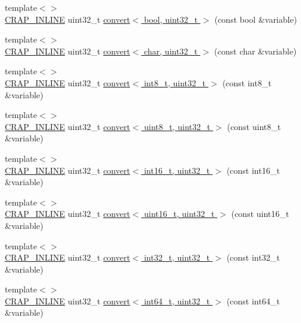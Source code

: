 \begin{DoxyCompactItemize}
\item 
{\footnotesize template$<$$>$ }\\\hyperlink{config__x86_8h_a5a40526b8d842e7ff731509998bb0f1c}{C\+R\+A\+P\+\_\+\+I\+N\+L\+I\+N\+E} uint32\+\_\+t \hyperlink{namespacecrap_aece15dfafe39298514a2b4d2c488994b}{convert$<$ bool, uint32\+\_\+t $>$} (const bool \&variable)
\item 
{\footnotesize template$<$$>$ }\\\hyperlink{config__x86_8h_a5a40526b8d842e7ff731509998bb0f1c}{C\+R\+A\+P\+\_\+\+I\+N\+L\+I\+N\+E} uint32\+\_\+t \hyperlink{namespacecrap_a2374171de1b2f137cbf0b27d0af1c397}{convert$<$ char, uint32\+\_\+t $>$} (const char \&variable)
\item 
{\footnotesize template$<$$>$ }\\\hyperlink{config__x86_8h_a5a40526b8d842e7ff731509998bb0f1c}{C\+R\+A\+P\+\_\+\+I\+N\+L\+I\+N\+E} uint32\+\_\+t \hyperlink{namespacecrap_ab60ee8dd4e0a4264fd5c1a24c3faeafa}{convert$<$ int8\+\_\+t, uint32\+\_\+t $>$} (const int8\+\_\+t \&variable)
\item 
{\footnotesize template$<$$>$ }\\\hyperlink{config__x86_8h_a5a40526b8d842e7ff731509998bb0f1c}{C\+R\+A\+P\+\_\+\+I\+N\+L\+I\+N\+E} uint32\+\_\+t \hyperlink{namespacecrap_a5b2a9e7f09553c2c2f61e23271999088}{convert$<$ uint8\+\_\+t, uint32\+\_\+t $>$} (const uint8\+\_\+t \&variable)
\item 
{\footnotesize template$<$$>$ }\\\hyperlink{config__x86_8h_a5a40526b8d842e7ff731509998bb0f1c}{C\+R\+A\+P\+\_\+\+I\+N\+L\+I\+N\+E} uint32\+\_\+t \hyperlink{namespacecrap_a7eaed95b8d0c79294406b7333c3bcfe7}{convert$<$ int16\+\_\+t, uint32\+\_\+t $>$} (const int16\+\_\+t \&variable)
\item 
{\footnotesize template$<$$>$ }\\\hyperlink{config__x86_8h_a5a40526b8d842e7ff731509998bb0f1c}{C\+R\+A\+P\+\_\+\+I\+N\+L\+I\+N\+E} uint32\+\_\+t \hyperlink{namespacecrap_a6b334f886e5674b8046ef1768ea73fa6}{convert$<$ uint16\+\_\+t, uint32\+\_\+t $>$} (const uint16\+\_\+t \&variable)
\item 
{\footnotesize template$<$$>$ }\\\hyperlink{config__x86_8h_a5a40526b8d842e7ff731509998bb0f1c}{C\+R\+A\+P\+\_\+\+I\+N\+L\+I\+N\+E} uint32\+\_\+t \hyperlink{namespacecrap_aa287c43c18e43139d5f4f983600744b8}{convert$<$ int32\+\_\+t, uint32\+\_\+t $>$} (const int32\+\_\+t \&variable)
\item 
{\footnotesize template$<$$>$ }\\\hyperlink{config__x86_8h_a5a40526b8d842e7ff731509998bb0f1c}{C\+R\+A\+P\+\_\+\+I\+N\+L\+I\+N\+E} uint32\+\_\+t \hyperlink{namespacecrap_abd6ca924d7770e701496a58203117557}{convert$<$ int64\+\_\+t, uint32\+\_\+t $>$} (const int64\+\_\+t \&variable)

\end{DoxyCompactItemize}
